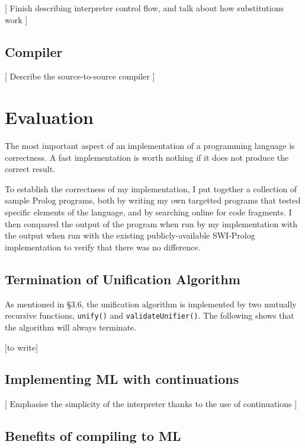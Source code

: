 \documentclass[12pt]{article}
\begin{document}
[ Finish describing interpreter control flow, and talk about how substitutions work ]

\subsection{Compiler}

[ Describe the source-to-source compiler ]

\newpage

\section{Evaluation}



The most important aspect of an implementation of a programming language is correctness. 
A fast implementation is worth nothing if it does not produce the correct result.

To establish the correctness of my implementation, I put together a collection of sample Prolog programs, both by writing my own targetted programs that tested specific elements of the language, and by searching online for code fragments. 
I then compared the output of the program when run by my implementation with the output when run with the existing publicly-available SWI-Prolog implementation to verify that there was no difference.

\subsection{Termination of Unification Algorithm}

As mentioned in \S3.6, the unification algorithm is implemented by two mutually recursive functions, \verb|unify()| and \verb|validateUnifier()|. The following shows that the algorithm will always terminate.

[to write]

\subsection{Implementing ML with continuations}

[ Emphasise the simplicity of the interpreter thanks to the use of continuations ]

\subsection{Benefits of compiling to ML}
\end{document}
